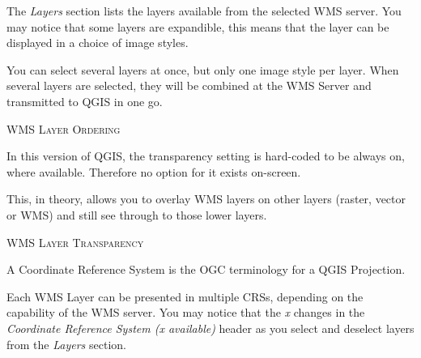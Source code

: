
The \textsl{Layers} section lists the layers available from the selected
WMS server.  You may notice that some layers are expandible, this means
that the layer can be displayed in a choice of image styles.

You can select several layers at once, but only one image style per layer.
When several layers are selected, they will be combined at the WMS Server
and transmitted to QGIS in one go.

\begin{Tip}[h]\caption{\textsc{WMS Layer Ordering}}
\end{Tip}

In this version of QGIS, the transparency setting is hard-coded to 
be always on, where available.  Therefore no option for it exists
on-screen.

This, in theory, allows you to overlay WMS layers on other layers (raster,
vector or WMS) and still see through to those lower layers.

\begin{Tip}[h]\caption{\textsc{WMS Layer Transparency}}
\end{Tip}


A Coordinate Reference System is the OGC terminology for a QGIS Projection.

Each WMS Layer can be presented in multiple CRSs, depending
on the capability of the WMS server.  You may notice that the \textsl{x} changes in
the \textsl{Coordinate Reference System (x available)} header as you
select and deselect layers from the \textsl{Layers} section.

